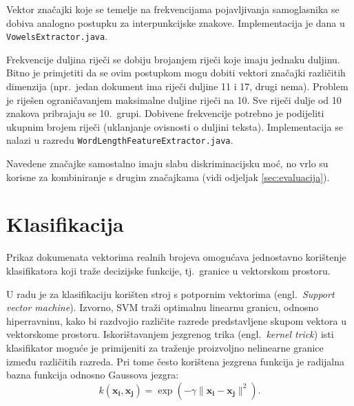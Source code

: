\documentclass{article}
\newcommand{\engl}[1]{(engl.~\emph{#1})}
\begin{document}
Vektor značajki koje se temelje na frekvencijama pojavljivanja samoglasnika se
dobiva analogno postupku za interpunkcijske znakove. Implementacija je dana u
\texttt{VowelsExtractor.java}.

Frekvencije duljina riječi se dobiju brojanjem riječi koje imaju jednaku duljinu.
Bitno je primjetiti da se ovim postupkom mogu dobiti vektori značajki različitih
dimenzija (npr.~jedan dokument ima riječi duljine 11 i 17, drugi nema). Problem
je riješen ograničavanjem maksimalne duljine riječi na 10. Sve riječi dulje od 10
znakova pribrajaju se 10.~grupi. Dobivene frekvencije potrebno je podijeliti
ukupnim brojem riječi (uklanjanje ovisnosti o duljini teksta). Implementacija se
nalazi u razredu \texttt{WordLengthFeatureExtractor.java}.

Navedene značajke samostalno imaju slabu diskriminacijsku moć, no vrlo su korisne
za kombiniranje s drugim značajkama (vidi odjeljak \ref{sec:evaluacija}).

\section{Klasifikacija}
Prikaz dokumenata vektorima realnih brojeva omogućava jednostavno korištenje
klasifikatora koji traže decizijske funkcije, tj.~granice u vektorskom
prostoru.


U radu je za klasifikaciju korišten stroj s potpornim vektorima \engl{Support
vector machine}. Izvorno, SVM traži optimalnu linearnu granicu, odnosno
hiperravninu, kako bi razdvojio različite razrede predstavljene skupom vektora u
vektorskome prostoru. Iskorištavanjem jezgrenog trika \engl{kernel trick} isti
klasifikator moguće je primijeniti za traženje proizvoljno nelinearne granice
između različitih razreda. Pri tome često korištena jezgrena funkcija je
radijalna bazna funkcija odnosno Gaussova jezgra:
\begin{equation}
k(\mathbf{x_i},\mathbf{x_j})=\exp(-\gamma \|\mathbf{x_i} - \mathbf{x_j}\|^2).
\end{equation}
\end{document}
